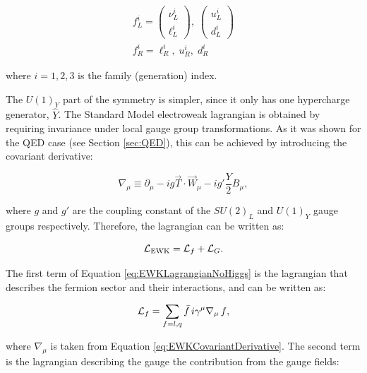 \begin{equation}
\begin{split}
f_L^i = \left(
    \begin{matrix}
    \nu_L^i \\
    \ell_L^i
    \end{matrix} \right) ,\;
    \left(
    \begin{matrix}
    u_L^i \\
    d_L^i
    \end{matrix} \right) \\
f_R^i = \ell_R^i,\; u_R^i,\; d_R^i
\end{split}
\label{eq:EWKmultiplets}
\end{equation}

\noindent where $i=1,2,3$ is the family (generation) index.

The $U(1)_Y$ part of the symmetry is simpler, since it only has one hypercharge generator, $\hat{Y}$.
The Standard Model electroweak lagrangian is obtained by requiring invariance under local gauge group transformations.
As it was shown for the QED case (see Section \ref{sec:QED}), this can be achieved by introducing the covariant derivative:

\begin{equation}
\nabla_\mu \equiv \partial_\mu - ig\vec{T}\cdot\vec{W}_\mu - ig'\frac{Y}{2}B_\mu,
\label{eq:EWKCovariantDerivative}
\end{equation}

\noindent where $g$ and $g'$ are the coupling constant of the $SU(2)_L$ and $U(1)_Y$ gauge groups respectively.
Therefore, the lagrangian can be written as:

\begin{equation}
\mathcal{L}_{\text{EWK}} = \mathcal{L}_{f} + \mathcal{L}_{G}.
\label{eq:EWKLagrangianNoHiggs}
\end{equation}

The first term of Equation \ref{eq:EWKLagrangianNoHiggs} is the lagrangian that describes the fermion sector and their interactions, and can be written as:

\begin{equation}
\mathcal{L}_{f} = \sum_{f=l,q}{\bar{f} \, i\gamma^\mu \nabla_\mu \,f},
\label{eq:EWKLagrangianFermions}
\end{equation}

\noindent where $\nabla_\mu$ is taken from Equation \ref{eq:EWKCovariantDerivative}.
The second term is the lagrangian describing the gauge the contribution from the gauge fields:

